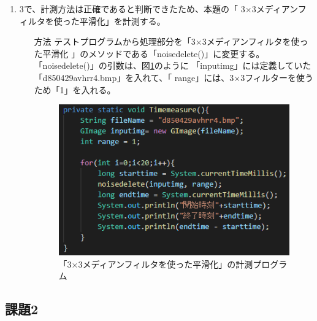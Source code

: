 \begin{enumerate}
\begin{itemize}
  \end{itemize}
\item 3で、計測方法は正確であると判断できたため、本題の「
3×3メディアンフィルタを使った平滑化」を計測する。
\begin{itemize}
  \item[方法] テストプログラムから処理部分を「3×3メディアンフィルタを使った平滑化
  」のメソッドである「noisedelete()」に変更する。
  「noisedelete()」の引数は、図\ref{graph:9}のように
  「inputimg」には定義していた「d850429avhrr4.bmp」を入れて、「
  range」には、3×3フィルターを使うため「1」を入れる。
  \begin{figure}[htbp]
    \begin{minipage}[t]{\hsize}
      \centering
      \caption{「3×3メディアンフィルタを使った平滑化」の計測プログラム}
      \label{graph:9}
      \includegraphics[scale=1]{課題1の計測1.PNG}
    \end{minipage}
  \end{figure}

\end{itemize}
  
\end{enumerate}
\clearpage

\subsection{課題2}
